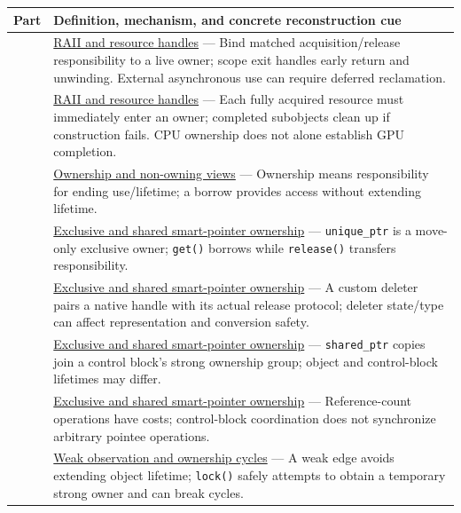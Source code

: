 {\def\LTcaptype{none} %
\begin{longtable}[]{@{}
  >{\raggedright\arraybackslash}p{}
  >{\raggedright\arraybackslash}p{}@{}}
\toprule\noalign{}
\begin{minipage}[b]{\linewidth}\raggedright
Part
\end{minipage} & \begin{minipage}[b]{\linewidth}\raggedright
Definition, mechanism, and concrete reconstruction cue
\end{minipage} \\
\midrule\noalign{}
\endhead
\bottomrule\noalign{}
\endlastfoot
148 & \hyperref[appendix-69739d3ab49b]{RAII and resource handles} --- Bind matched acquisition/release responsibility to a live owner; scope exit handles early return and unwinding. External asynchronous use can require deferred reclamation. \\
149 & \hyperref[appendix-69739d3ab49b]{RAII and resource handles} --- Each fully acquired resource must immediately enter an owner; completed subobjects clean up if construction fails. CPU ownership does not alone establish GPU completion. \\
150 & \hyperref[appendix-d52e4486f527]{Ownership and non-owning views} --- Ownership means responsibility for ending use/lifetime; a borrow provides access without extending lifetime. \\
151 & \hyperref[appendix-51602cabe815]{Exclusive and shared smart-pointer ownership} --- \texttt{unique\_ptr} is a move-only exclusive owner; \texttt{get()} borrows while \texttt{release()} transfers responsibility. \\
152 & \hyperref[appendix-51602cabe815]{Exclusive and shared smart-pointer ownership} --- A custom deleter pairs a native handle with its actual release protocol; deleter state/type can affect representation and conversion safety. \\
153 & \hyperref[appendix-51602cabe815]{Exclusive and shared smart-pointer ownership} --- \texttt{shared\_ptr} copies join a control block's strong ownership group; object and control-block lifetimes may differ. \\
154 & \hyperref[appendix-51602cabe815]{Exclusive and shared smart-pointer ownership} --- Reference-count operations have costs; control-block coordination does not synchronize arbitrary pointee operations. \\
155 & \hyperref[appendix-b9548675eb2b]{Weak observation and ownership cycles} --- A weak edge avoids extending object lifetime; \texttt{lock()} safely attempts to obtain a temporary strong owner and can break cycles. \\

\end{longtable}}
